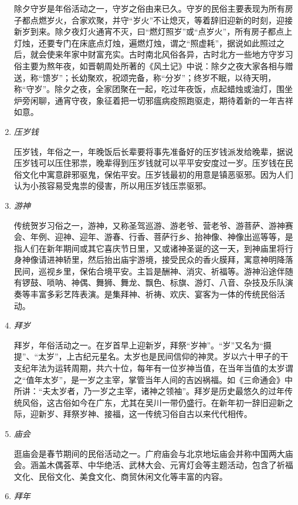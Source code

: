 \begin{enumerate}
除夕守岁是年俗活动之一，守岁之俗由来已久。守岁的民俗主要表现为所有房子都点燃岁火，合家欢聚，并守“岁火”不让熄灭，等着辞旧迎新的时刻，迎接新岁到来。除夕夜灯火通宵不灭，曰“燃灯照岁”或“点岁火”，所有房子都点上灯烛，还要专门在床底点灯烛，遍燃灯烛，谓之“照虚耗”，据说如此照过之后，就会使来年家中财富充实。古时南北风俗各异，古时北方一些地方守岁习俗主要为熬年夜，如晋朝周处所著的《风土记》中说：除夕之夜大家各相与赠送，称“馈岁”；长幼聚欢，祝颂完备，称“分岁”；终岁不眠，以待天明，称“守岁”。除夕之夜，全家团聚在一起，吃过年夜饭，点起蜡烛或油灯，围坐炉旁闲聊，通宵守夜，象征着把一切邪瘟病疫照跑驱走，期待着新的一年吉祥如意。

\item \emph{压岁钱}

压岁钱，年俗之一，年晚饭后长辈要将事先准备好的压岁钱派发给晚辈，据说压岁钱可以压住邪祟，晚辈得到压岁钱就可以平平安安度过一岁。压岁钱在民俗文化中寓意辟邪驱鬼，保佑平安。压岁钱最初的用意是镇恶驱邪。因为人们认为小孩容易受鬼祟的侵害，所以用压岁钱压祟驱邪。

\item \emph{游神}

传统贺岁习俗之一，游神，又称圣驾巡游、游老爷、营老爷、游菩萨、游神赛会、年例、迎神、迎年、游春、行香、菩萨行乡、抬神像、神像出巡等等，是指人们在新年期间或其它喜庆节日里，又或诸神圣诞的这一天，到神庙里将行身神像请进神轿里，然后抬出庙宇游境，接受民众的香火膜拜，寓意神明降落民间，巡视乡里，保佑合境平安。主旨是酬神、消灾、祈福等。游神沿途伴随有锣鼓、唢呐、神偶、舞狮、舞龙、飘色、标旗、游灯、八音、杂技及乐队演奏等丰富多彩艺阵表演。是集拜神、祈祷、欢庆、宴客为一体的传统民俗活动。

\item \emph{拜岁}

拜岁，年俗活动之一。在岁首早上迎新岁，拜祭“岁神”。“岁”又名为“摄提”、“太岁”，上古纪元星名。太岁也是民间信仰的神灵。岁以六十甲子的干支纪年法为运转周期，共六十位，每年有一位岁神当值，在当年当值的太岁谓之“值年太岁”，是一岁之主宰，掌管当年人间的吉凶祸福。如《三命通会》中所讲：“夫太岁者，乃一岁之主宰，诸神之领袖”。拜岁是历史最悠久的过年传统风俗，这古俗如今在广东，尤其在吴川一带仍盛行。在新年初一辞旧迎新之际，迎新岁、拜祭岁神、接福，这一传统习俗自古以来代代相传。

\item \emph{庙会}

逛庙会是春节期间的民俗活动之一。广府庙会与北京地坛庙会并称中国两大庙会。涵盖木偶荟萃、中华绝活、武林大会、元宵灯会等主题活动，包含了祈福文化、民俗文化、美食文化、商贸休闲文化等丰富的内容。

\item \emph{拜年}


\end{enumerate}
